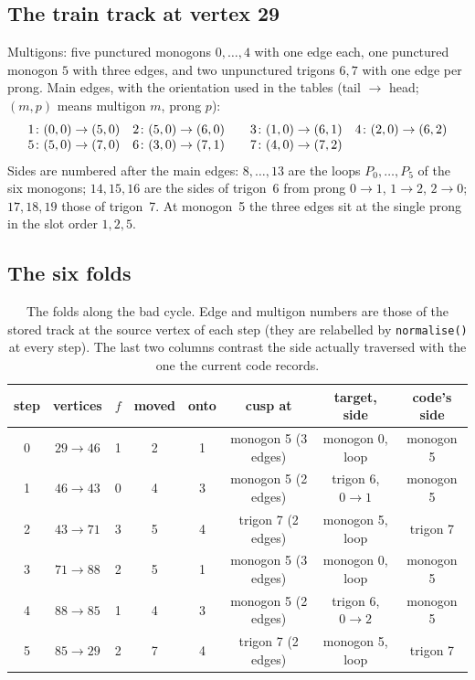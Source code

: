 \documentclass[12pt]{amsart}
\newcommand{\code}[1]{\texttt{#1}}
\newcommand{\per}{P}                      %
\theoremstyle{plain}
\theoremstyle{definition}
\begin{document}
\subsection{The train track at vertex 29}
Multigons: five punctured monogons $0,\dots,4$ with one edge each, one
punctured monogon $5$ with three edges, and two unpunctured trigons $6,7$
with one edge per prong.  Main edges, with the orientation used in the
tables (tail $\to$ head; $(m,p)$ means multigon $m$, prong $p$):
\[
  \begin{array}{ll@{\qquad}ll}
    1\colon (0,0)\to(5,0) & 2\colon (5,0)\to(6,0) & 3\colon (1,0)\to(6,1) & 4\colon (2,0)\to(6,2)\\
    5\colon (5,0)\to(7,0) & 6\colon (3,0)\to(7,1) & 7\colon (4,0)\to(7,2) &
  \end{array}
\]
Sides are numbered after the main edges: $8,\dots,13$ are the loops
$\per_0,\dots,\per_5$ of the six monogons; $14,15,16$ are the sides of
trigon~6 from prong $0\to1$, $1\to2$, $2\to0$; $17,18,19$ those of
trigon~7.  At monogon~5 the three edges sit at the single prong in the
slot order $1,2,5$.

\subsection{The six folds}

\begin{table}[h]
  \centering
  \small
  \begin{tabular}{@{}cccccccc@{}}
    \toprule
    step & vertices & $f$ & moved & onto & cusp at & target, side & code's side \\
    \midrule
    0 & $29\to46$ & 1 & 2 & 1 & monogon 5 (3 edges) & monogon 0, loop & monogon 5 \\
    1 & $46\to43$ & 0 & 4 & 3 & monogon 5 (2 edges) & trigon 6, $0\to1$ & monogon 5 \\
    2 & $43\to71$ & 3 & 5 & 4 & trigon 7 (2 edges)  & monogon 5, loop & trigon 7 \\
    3 & $71\to88$ & 2 & 5 & 1 & monogon 5 (3 edges) & monogon 0, loop & monogon 5 \\
    4 & $88\to85$ & 1 & 4 & 3 & monogon 5 (2 edges) & trigon 6, $0\to2$ & monogon 5 \\
    5 & $85\to29$ & 2 & 7 & 4 & trigon 7 (2 edges)  & monogon 5, loop & trigon 7 \\
    \bottomrule
  \end{tabular}
  \caption{The folds along the bad cycle.  Edge and multigon numbers are
    those of the stored track at the source vertex of each step (they are
    relabelled by \code{normalise()} at every step).  The last two columns
    contrast the side actually traversed with the one the current code
    records.}
  \label{tab:folds}
\end{table}
\end{document}
